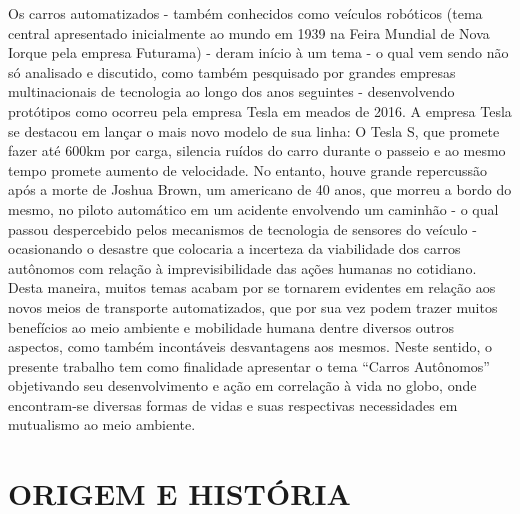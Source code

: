 \documentclass[a4paper, 12pt]{article}
\begin{document}
Os carros automatizados - também conhecidos como veículos robóticos (tema central apresentado inicialmente ao mundo em 1939 na Feira Mundial de Nova Iorque pela empresa Futurama) - deram início à um tema - o qual vem sendo não só analisado e discutido, como também pesquisado por grandes empresas multinacionais de tecnologia ao longo dos anos seguintes -  desenvolvendo protótipos como ocorreu pela empresa Tesla em meados de 2016. 
A empresa Tesla se destacou em lançar o mais novo modelo de sua linha: O Tesla S, que promete fazer até 600km por carga, silencia ruídos do carro durante o passeio e ao mesmo tempo promete aumento de velocidade. No entanto, houve grande repercussão após a morte de Joshua Brown, um americano de 40 anos, que morreu a bordo do mesmo, no piloto automático em um acidente envolvendo um caminhão - o qual passou despercebido pelos mecanismos de tecnologia de sensores do veículo - ocasionando o desastre que colocaria a incerteza da viabilidade dos carros autônomos com relação à imprevisibilidade das ações humanas no cotidiano. 
Desta maneira, muitos temas acabam por se tornarem evidentes em relação aos novos meios de transporte automatizados, que por sua vez podem trazer muitos benefícios ao meio ambiente e mobilidade humana dentre diversos outros aspectos, como também incontáveis desvantagens aos mesmos.
Neste sentido, o presente trabalho tem como finalidade apresentar o tema “Carros Autônomos” objetivando seu desenvolvimento e ação em correlação à vida no globo, onde encontram-se diversas formas de vidas e suas respectivas necessidades em mutualismo ao meio ambiente.
 \newpage
 
\section{ORIGEM E HISTÓRIA}
\end{document}
